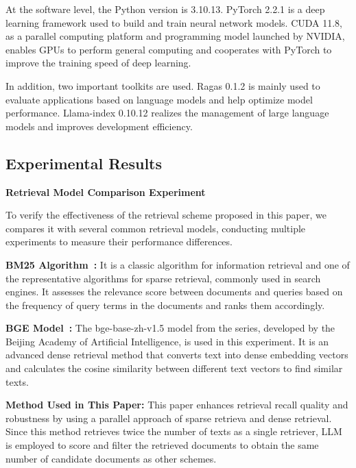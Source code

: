 At the software level, the Python version is 3.10.13. PyTorch 2.2.1 is a deep learning framework used to build and train neural network models. CUDA 11.8, as a parallel computing platform and programming model launched by NVIDIA, enables GPUs to perform general computing and cooperates with PyTorch to improve the training speed of deep learning.

In addition, two important toolkits are used. Ragas 0.1.2 is mainly used to evaluate applications based on language models and help optimize model performance. Llama-index 0.10.12 realizes the management of large language models and improves development efficiency.

\subsection{Experimental Results}
\textbf{Retrieval Model Comparison Experiment}

To verify the effectiveness of the retrieval scheme proposed in this paper, we compares it with several common retrieval models, conducting multiple experiments to measure their performance differences.

\textbf{BM25 Algorithm~\cite{robertson2009probabilistic}:} It is a classic algorithm for information retrieval and one of the representative algorithms for sparse retrieval, commonly used in search engines. It assesses the relevance score between documents and queries based on the frequency of query terms in the documents and ranks them accordingly.

\textbf{BGE Model~\cite{luo2024bge}:} The bge-base-zh-v1.5 model from the series, developed by the Beijing Academy of Artificial Intelligence, is used in this experiment. It is an advanced dense retrieval method that converts text into dense embedding vectors and calculates the cosine similarity between different text vectors to find similar texts.

\textbf{Method Used in This Paper:} This paper enhances retrieval recall quality and robustness by using a parallel approach of sparse retrieva and dense retrieval. Since this method retrieves twice the number of texts as a single retriever, LLM is employed to score and filter the retrieved documents to obtain the same number of candidate documents as other schemes.



